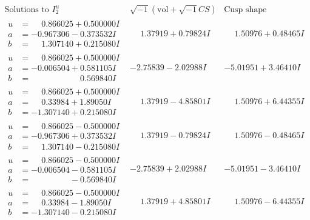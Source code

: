 \documentclass[1p]{elsarticle_modified}
\theoremstyle{definition}
\newcommand{\I}{\sqrt{-1}}
\begin{document}
$$\begin{array}{c|c|c}  
\text{Solutions to }I^u_{2}& \I (\text{vol} + \sqrt{-1}CS) & \text{Cusp shape}\\
 \hline 
\begin{aligned}
u &= \phantom{-}0.866025 + 0.500000 I \\
a &= -0.967306 - 0.373532 I \\
b &= \phantom{-}1.307140 + 0.215080 I\end{aligned}
 & \phantom{-}1.37919 + 0.79824 I & \phantom{-}1.50976 + 0.48465 I \\ \hline\begin{aligned}
u &= \phantom{-}0.866025 + 0.500000 I \\
a &= -0.006504 + 0.581105 I \\
b &= \phantom{-0.000000 -}0.569840 I\end{aligned}
 & -2.75839 - 2.02988 I & -5.01951 + 3.46410 I \\ \hline\begin{aligned}
u &= \phantom{-}0.866025 + 0.500000 I \\
a &= \phantom{-}0.33984 + 1.89050 I \\
b &= -1.307140 + 0.215080 I\end{aligned}
 & \phantom{-}1.37919 - 4.85801 I & \phantom{-}1.50976 + 6.44355 I \\ \hline\begin{aligned}
u &= \phantom{-}0.866025 - 0.500000 I \\
a &= -0.967306 + 0.373532 I \\
b &= \phantom{-}1.307140 - 0.215080 I\end{aligned}
 & \phantom{-}1.37919 - 0.79824 I & \phantom{-}1.50976 - 0.48465 I \\ \hline\begin{aligned}
u &= \phantom{-}0.866025 - 0.500000 I \\
a &= -0.006504 - 0.581105 I \\
b &= \phantom{-0.000000 } -0.569840 I\end{aligned}
 & -2.75839 + 2.02988 I & -5.01951 - 3.46410 I \\ \hline\begin{aligned}
u &= \phantom{-}0.866025 - 0.500000 I \\
a &= \phantom{-}0.33984 - 1.89050 I \\
b &= -1.307140 - 0.215080 I\end{aligned}
 & \phantom{-}1.37919 + 4.85801 I & \phantom{-}1.50976 - 6.44355 I \\ \hline\begin{aligned}

\end{aligned}
\end{array}$$
\end{document}
